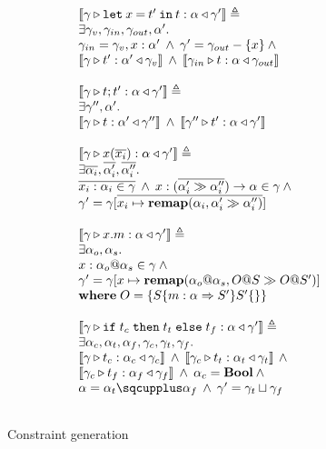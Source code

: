 \documentclass[preprint]{sigplanconf}
\newcommand{\remapapp}[3]{\ensuremath{\mathbf{remap}(#1, #2 \gg #3)}}
\newcommand{\inferrule}[4]{\left\llbracket #1 \triangleright #2 : #3 \triangleleft #4 \right\rrbracket}
\newcommand{\inferlhs}[1]{\left\llbracket \gamma \triangleright #1 : \alpha \triangleleft \gamma' \right\rrbracket}
\newcommand{\boolt}{\mathbf{Bool}}
\newcommand{\lett}[3]{\mathtt{let}\:#1\:\mathtt{=}\:#2\:\mathtt{in}\:#3}
\newcommand{\ift}[3]{\mathtt{if} \; #1 \; \mathtt{then} \; #2 \; \mathtt{else} \; #3}
\newcommand{\cand}{\:\wedge\:}
\begin{document}
\begin{figure}
\[\begin{array}{ll}
\inferlhs{\lett{x}{t'}{t}} \triangleq \\
\exists \gamma_v, \gamma_{in}, \gamma_{out}, \alpha' . \\
\gamma_{in} = \gamma_v, x : \alpha'
\cand
\gamma' = \gamma_{out} - \{ x \}
\cand \\
\inferrule{\gamma}{t'}{\alpha'}{\gamma_v}
\cand
\inferrule{\gamma_{in}}{t}{\alpha}{\gamma_{out}}
\\\\

\inferlhs{t ; t'} \triangleq \\
\exists \gamma'', \alpha' . \\
\inferrule{\gamma}{t}{\alpha'}{\gamma''}
\cand
\inferrule{\gamma''}{t'}{\alpha}{\gamma'}
\\\\

\inferlhs{x ( \overline{x_i} )} \triangleq \\
\exists \overline{\alpha_i}, \overline{\alpha_i'}, \overline{\alpha_i''} . \\
\overline{x_i : \alpha_i \in \gamma}
\cand 
x : ( \overline{\alpha_i' \gg \alpha_i''} ) \rightarrow \alpha \in \gamma
\cand
\\
\gamma' = \gamma [ \overline{x_i \mapsto \remapapp{\alpha_i}{\alpha_i'}{\alpha_i''} } ]
\\\\

\inferlhs{x.m} \triangleq \\
\exists \alpha_o, \alpha_s . \\
x : \alpha_o@\alpha_s \in \gamma
\cand \\
\gamma' = \gamma[ x \mapsto \remapapp{\alpha_o@\alpha_s}{O@S}{O@S'} ]
\\
\mathbf{where}\; O = \{ S \{ m : \alpha \Rightarrow S' \} S' \{ \} \}
\\\\

\inferlhs{\ift{t_c}{t_t}{t_f}} \triangleq \\
\exists \alpha_c, \alpha_t, \alpha_f, \gamma_c, \gamma_t, \gamma_f . \\
\inferrule{\gamma}{t_c}{\alpha_c}{\gamma_c}
\cand
\inferrule{\gamma_c}{t_t}{\alpha_t}{\gamma_t}
\cand 
\\
\inferrule{\gamma_c}{t_f}{\alpha_f}{\gamma_f}
\cand
\alpha_c = \boolt
\cand
\\
\alpha = \alpha_t \sqcupplus \alpha_f
\cand
\gamma' = \gamma_t \sqcup \gamma_f
\\\\

\end{array}
\]
\caption{\label{fig:constraintgen} Constraint generation}
\end{figure}
\end{document}
